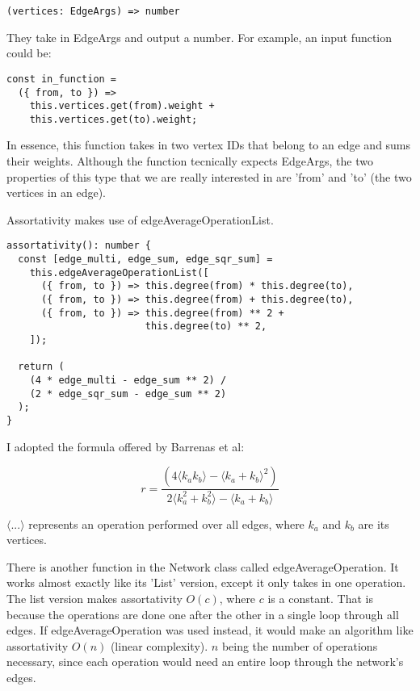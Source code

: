 \begin{verbatim}
(vertices: EdgeArgs) => number
\end{verbatim}

They take in EdgeArgs and output a number.
For example, an input function could be:

\begin{verbatim}
const in_function =
  ({ from, to }) =>
    this.vertices.get(from).weight +
    this.vertices.get(to).weight;
\end{verbatim}

In essence, this function takes in two vertex IDs that belong to an edge and sums their weights.
Although the function tecnically expects EdgeArgs,
the two properties of this type that we are really interested in are 'from' and 'to' (the two vertices in an edge).

Assortativity makes use of edgeAverageOperationList.

\begin{verbatim}
assortativity(): number {
  const [edge_multi, edge_sum, edge_sqr_sum] =
    this.edgeAverageOperationList([
      ({ from, to }) => this.degree(from) * this.degree(to),
      ({ from, to }) => this.degree(from) + this.degree(to),
      ({ from, to }) => this.degree(from) ** 2 +
                        this.degree(to) ** 2,
    ]);

  return (
    (4 * edge_multi - edge_sum ** 2) /
    (2 * edge_sqr_sum - edge_sum ** 2)
  );
}
\end{verbatim}

I adopted the formula offered by Barrenas et al:

$$r=\frac{(4\langle k_a k_b\rangle-\langle k_a+k_b\rangle^2)}{2\langle k_a^2+k_b^2\rangle-\langle k_a+k_b\rangle}$$

$\langle ... \rangle$ represents an operation performed over all edges,
where $k_a$ and $k_b$ are its vertices.

There is another function in the Network class called edgeAverageOperation.
It works almost exactly like its 'List' version, except it only takes in one operation.
The list version makes assortativity $O(c)$, where $c$ is a constant.
That is because the operations are done one after the other in a single loop through all edges.
If edgeAverageOperation was used instead, it would make an algorithm like assortativity $O(n)$ (linear complexity).
$n$ being the number of operations necessary, since each operation would need an entire loop through the network's edges.


